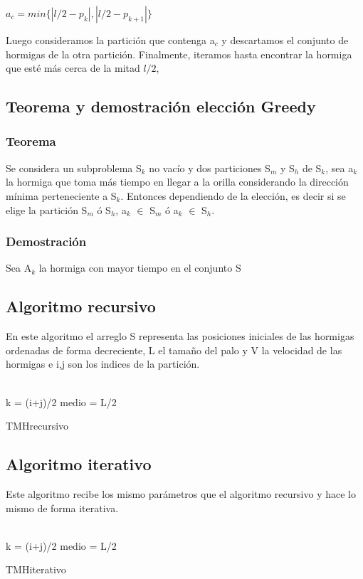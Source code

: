 \documentclass[11pt,spanish]{article}
\begin{document}
\begin{center} $a_{c} = min\{|l/2-p_k|,|l/2-p_{k+1}|\}$\end{center}
Luego consideramos la partición que contenga a$_{c}$ y descartamos el conjunto de hormigas de la otra partición. Finalmente, iteramos hasta encontrar la hormiga que esté más cerca de la mitad $l/2$,
\subsection{Teorema y demostración elección Greedy}
\subsubsection{Teorema}
Se considera un subproblema S$_{k}$ no vacío y dos particiones S$_{m}$ y S$_{h}$ de S$_{k}$, sea a$_{k}$ la hormiga que toma más tiempo en llegar a la orilla considerando la dirección mínima perteneciente a S$_{k}$. Entonces dependiendo de la elección, es decir si se elige la partición S$_{m}$ ó S$_{h}$, a$_{k}$ $\in$ S$_{m}$ ó a$_{k}$ $\in$ S$_{h}$.
\subsubsection{Demostración}
Sea A$_{k}$ la hormiga con mayor tiempo en el conjunto S
\subsection{Algoritmo recursivo}
En este algoritmo el arreglo S representa las posiciones iniciales de las hormigas ordenadas de forma decreciente, L el tamaño del palo y V la velocidad de las hormigas e i,j son los indices de la partición.\\\\
\begin{algorithm}[H]
 k = (i+j)/2\;
 medio = L/2\;
 \caption{TMHrecursivo}
 \label{fig:algo1}
\end{algorithm}
\subsection{Algoritmo iterativo}
Este algoritmo recibe los mismo parámetros que el algoritmo recursivo y hace lo mismo de forma iterativa.\\\\
\begin{algorithm}[H]
 k = (i+j)/2\;
 medio = L/2\;
 \caption{TMHiterativo}
 \label{fig:algo2}
\end{algorithm}
\end{document}
